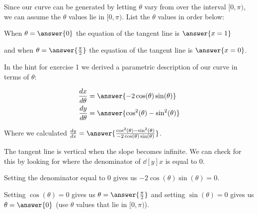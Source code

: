 \documentclass{ximera}
\begin{document}
\begin{exercise}
\begin{exercise}
Since our curve can be generated by letting $\theta$ vary from over the interval $[0, \pi)$, we can assume the $\theta$ values lie in $[0, \pi)$. List the $\theta$ values in order below: 

When $\theta=\answer{0}$ the equation of the tangent line is $\answer{x=1 }$ 

and when $\theta=\answer{ \frac{\pi}{2}}$ the equation of the tangent line is $\answer{x=0}$. 





\begin{hint}


In the hint for exercise 1 we derived a parametric description of our curve in terms of $\theta$: 

\begin{align*}
\dd[x]{\theta}&=\answer{ -2\cos(\theta)\sin(\theta)  } \\
\dd[y]{\theta}&=\answer{ \cos^2(\theta)-\sin^2(\theta)    }
\end{align*} 

Where we calculated $\dd[y]{x}=\answer{ \frac{ \cos^2(\theta)-\sin^2(\theta)}{-2\cos(\theta)\sin(\theta)}}$. 

The tangent line is vertical when the slope becomes infinite. We can check for this by looking for where the denominator of $\dd[y]{x}$ is equal to $0$.

Setting the denominator equal to $0$ gives us $-2\cos(\theta)\sin(\theta)=0$. 

Setting $\cos(\theta)=0$ gives us $\theta=\answer{ \frac{\pi}{2}}$ and setting $\sin(\theta)=0$ gives us 
$\theta=\answer{ 0}$ (use $\theta$ values that lie in $[0, \pi)$). 



\end{hint}

\end{exercise}
\end{exercise}
\end{document}

